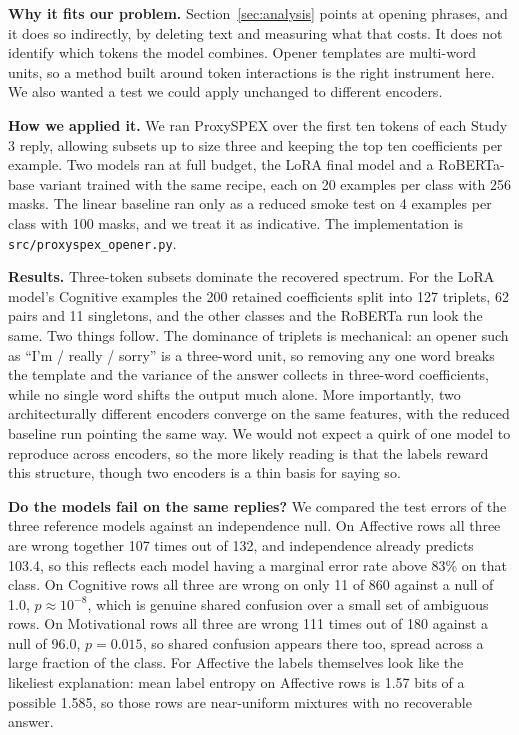\documentclass[11pt,a4paper]{article}
\begin{document}
\textbf{Why it fits our problem.} Section~\ref{sec:analysis} points at opening phrases, and
it does so indirectly, by deleting text and measuring what that costs. It does not identify
which tokens the model combines. Opener templates are multi-word units, so a
method built around token interactions is the right instrument here. We also wanted a test
we could apply unchanged to different encoders.

\textbf{How we applied it.} We ran ProxySPEX over the first ten tokens of each Study 3
reply, allowing subsets up to size three and keeping the top ten coefficients per example.
Two models ran at full budget, the LoRA final model and a RoBERTa-base variant trained with
the same recipe, each on 20 examples per class with 256 masks. The linear baseline ran only
as a reduced smoke test on 4 examples per class with 100 masks, and we treat it as
indicative. The implementation is \texttt{src/proxyspex\_opener.py}.

\textbf{Results.} Three-token subsets dominate the recovered spectrum. For the LoRA model's
Cognitive examples the 200 retained coefficients split into 127 triplets, 62 pairs and 11
singletons, and the other classes and the RoBERTa run look the same. Two things follow.
The dominance of triplets is mechanical: an opener such as ``I'm / really / sorry'' is a
three-word unit, so removing any one word breaks the template and the variance of the
answer collects in three-word coefficients, while no single word shifts the output much
alone. More importantly, two architecturally different encoders converge on the same
features, with the reduced baseline run pointing the same way. We would not expect a quirk of
one model to reproduce across encoders, so the more likely reading is that the labels reward
this structure, though two encoders is a thin basis for saying so.

\textbf{Do the models fail on the same replies?} We compared the test errors of the three
reference models against an independence null. On Affective rows all three are wrong
together 107 times out of 132, and independence already predicts 103.4, so this reflects
each model having a marginal error rate above 83\% on that class. On Cognitive rows all
three are wrong on only 11 of 860 against a null of 1.0, $p \approx 10^{-8}$, which is
genuine shared confusion over a small set of ambiguous rows. On Motivational rows all three
are wrong 111 times out of 180 against a null of 96.0, $p = 0.015$, so shared confusion
appears there too, spread across a large fraction of the class. For Affective the labels
themselves look like the likeliest explanation: mean label entropy on Affective rows is 1.57 bits of a
possible 1.585, so those rows are near-uniform mixtures with no recoverable answer.
\end{document}
